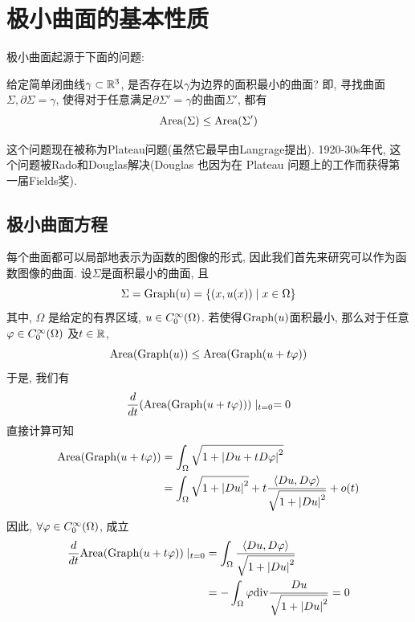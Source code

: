 \chapter{极小曲面的基本性质}
极小曲面起源于下面的问题:
\begin{question*}
    给定简单闭曲线$\gamma \subset \mathbb{R}^3$, 是否存在以$\gamma$为边界的面积最小的曲面? 即, 寻找曲面$\Sigma, \partial \Sigma = \gamma$, 使得对于任意满足$\partial \Sigma' = \gamma$的曲面$\Sigma'$, 都有
    \begin{equation*}
        \text{Area}(\Sigma) \le \text{Area}(\Sigma')
    \end{equation*}
\end{question*}
这个问题现在被称为Plateau问题(虽然它最早由Langrage提出). 1920-30s年代, 这个问题被Rado和Douglas解决(Douglas 也因为在 Plateau 问题上的工作而获得第一届Fields奖).
\section{极小曲面方程}
每个曲面都可以局部地表示为函数的图像的形式, 因此我们首先来研究可以作为函数图像的曲面. 设$\Sigma$是面积最小的曲面, 且
\begin{equation*}
    \Sigma= \text{Graph}(u)= \{(x,u(x))\mid x \in \Omega\}
\end{equation*}
其中, $\Omega$ 是给定的有界区域, $u \in {C^\infty_0}(\Omega)$. 若使得$\text{Graph}(u)$面积最小, 那么对于任意$\varphi \in {C^\infty_0}(\Omega)$ 及$t \in \mathbb{R}$,
\begin{equation}
    \text{Area}(\text{Graph}(u)) \le \text{Area}(\text{Graph}(u+t\varphi))
\end{equation}
于是, 我们有
\begin{equation}
    \frac{d}{dt}(\text{Area}(\text{Graph}(u+t\varphi)))\mid_ {t=0}=0
\end{equation}
直接计算可知
\begin{equation}
    \begin{split}
        \text{Area}(\text{Graph}(u+t\varphi)) &= \int_\Omega \sqrt{1+\left | Du+tD\varphi \right |^2} \\
                          &= \int_\Omega \sqrt{1+\left | Du \right |^2}+t\frac{{\left < Du, D\varphi \right >}}{\sqrt{1+\left | Du \right |^2}} + o(t)
    \end{split}
\end{equation}
因此, $\forall \varphi \in {C^\infty_0}(\Omega)$, 成立
\begin{equation}
    \begin{split}
        \frac{d}{dt} \text{Area}(\text{Graph}(u+t\varphi))\mid _{t=0} & = \int_\Omega \frac{{\left < Du, D\varphi \right >}}{\sqrt{1+\left | Du \right |^2}} \\
        &=- \int_\Omega \varphi {\text{div}} \frac{Du}{\sqrt{1+\left | Du \right |^2}} =0
    \end{split}
\end{equation}
